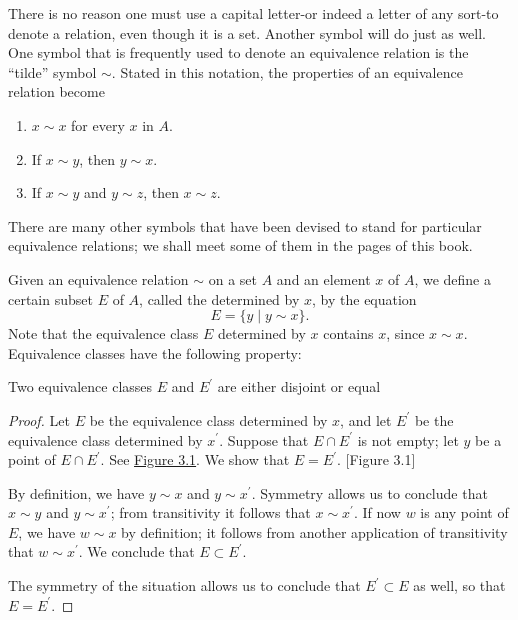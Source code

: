 There is no reason one must use a capital letter-or indeed a letter of any 
sort-to denote a relation, even though it is a set. 
Another symbol will do just as well. One symbol that is frequently used to 
denote an equivalence relation is the ``tilde'' symbol \(\sim\). 
Stated in this notation, the properties of an equivalence relation become

\begin{enumerate}[itemsep=0.2em, parsep=0pt, topsep=0pt, partopsep=0pt, leftmargin=*, label=(\arabic*), align=left]
\item \(x \sim x\) for every \(x\) in \(A\).

\item If \(x \sim y\), then \(y \sim x\).

\item If \(x \sim y\) and \(y \sim z\), then \(x \sim z\).
\end{enumerate}
There are many other symbols that have been devised to stand for particular 
equivalence relations; we shall meet some of them in the pages of this book.

Given an equivalence relation \(\sim\) on a set \(A\) and an element \(x\) of \(A\), 
we define a certain subset \(E\) of \(A\), called the  determined by \(x\), 
by the equation
\[
E = \{ y \mid y \sim x\}.
\]
Note that the equivalence class \(E\) determined by \(x\) contains \(x\), 
since \(x \sim x\). Equivalence classes have the following property:

\begin{lemma}
\label{lem:\thetheorem}
 Two equivalence classes \(E\) and \(E^{\prime }\) are either disjoint or equal
\end{lemma}

\begin{proof}
 Let \(E\) be the equivalence class determined by \(x\), and let \(E^{\prime }\) be the equivalence class determined by \(x^{\prime }\). Suppose that \(E \cap {E}^{\prime }\) is not empty; let \(y\) be a point of \(E \cap {E}^{\prime }\). See \hyperref[fig:3.1]{Figure 3.1}. We show that \(E = E^{\prime }\).
 [Figure 3.1]

 By definition, we have \(y \sim x\) and \(y \sim {x}^{\prime }\). 
 Symmetry allows us to conclude that \(x \sim y\) and \(y \sim {x}^{\prime }\); 
 from transitivity it follows that \(x \sim {x}^{\prime }\). 
 If now \(w\) is any point of \(E\), we have \(w \sim x\) by definition; 
 it follows from another application of transitivity that \(w \sim {x}^{\prime }\). 
 We conclude that \(E \subset {E}^{\prime }\).

 The symmetry of the situation allows us to conclude that \(E^{\prime } \subset E\) 
 as well, so that \(E = E^{\prime }\).
\end{proof}

